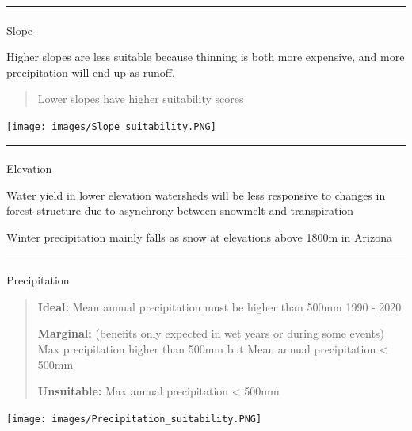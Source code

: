 \documentclass[
  number]{elsarticle}
\makeatletter
\let\oldparagraph\paragraph
\renewcommand{\paragraph}{
    \@ifstar
      \xxxParagraphStar
      \xxxParagraphNoStar
  }
\newcommand{\xxxParagraphStar}[1]{\oldparagraph*{#1}\mbox{}}
\newcommand{\xxxParagraphNoStar}[1]{\oldparagraph{#1}\mbox{}}
\makeatother
\begin{document}
\begin{center}\rule{0.5\linewidth}{0.5pt}\end{center}

\paragraph{Slope}\label{slope}

Higher slopes are less suitable because thinning is both more expensive,
and more precipitation will end up as runoff.

\begin{quote}
Lower slopes have higher suitability scores
\end{quote}

\texttt{[image: images/Slope\_suitability.PNG]}

\begin{center}\rule{0.5\linewidth}{0.5pt}\end{center}

\paragraph{Elevation}\label{elevation}

Water yield in lower elevation watersheds will be less responsive to
changes in forest structure due to asynchrony between snowmelt and
transpiration \citep{biederman2022}

Winter precipitation mainly falls as snow at elevations above 1800m in
Arizona \citep{friederici2013}

\begin{center}\rule{0.5\linewidth}{0.5pt}\end{center}

\paragraph{Precipitation}\label{precipitation}

\begin{quote}
\textbf{Ideal:} Mean annual precipitation must be higher than 500mm 1990
- 2020

\textbf{Marginal:} (benefits only expected in wet years or during some
events) Max precipitation higher than 500mm but Mean annual
precipitation \textless{} 500mm

\textbf{Unsuitable:} Max annual precipitation \textless{} 500mm
\end{quote}

\texttt{[image: images/Precipitation\_suitability.PNG]}
\end{document}
